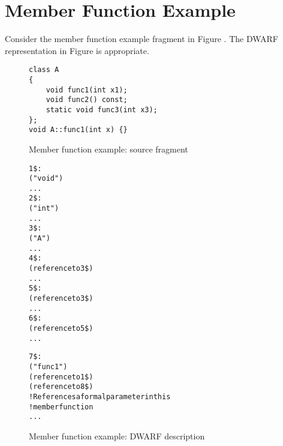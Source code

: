 \section{Member Function Example}
\label{app:memberfunctionexample}

Consider the member function example fragment in 
Figure .
The DWARF representation in 
Figure 
is appropriate.

\begin{figure}[Here]
\begin{lstlisting}
class A
{
    void func1(int x1);
    void func2() const;
    static void func3(int x3);
};
void A::func1(int x) {}
\end{lstlisting}
\caption{Member function example: source fragment}
\label{fig:memberfunctionexamplesourcefragment}
\end{figure}

\begin{figure}[h]
\begin{dwflisting}
\begin{alltt}
1\$: 
        ("void")
                ...
2\$: 
        ("int")
        ...
3\$: 
        ("A")
        ...
4\$:    
            (reference to 3\$)
            ...
5\$:    
            (reference to 3\$)
            ...
6\$:    
            (reference to 5\$)
            ...

7\$:    
            ("func1")
            (reference to 1\$)
            (reference to 8\$) 
                ! References a formal parameter in this 
                ! member function
            ...
\end{alltt}
\end{dwflisting}
\caption{Member function example: DWARF description}
\label{fig:memberfunctionexampledwarfdescription}
\end{figure}

